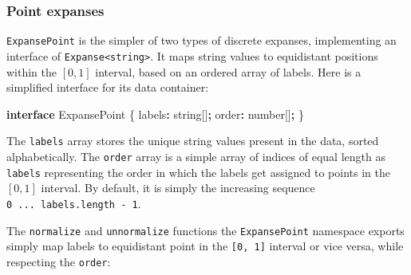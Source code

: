 \documentclass[
  openany]{book}
\newenvironment{Shaded}{\begin{snugshade}}{\end{snugshade}}
\newcommand{\DataTypeTok}[1]{\textcolor[rgb]{0.13,0.29,0.53}{#1}}
\newcommand{\KeywordTok}[1]{\textcolor[rgb]{0.13,0.29,0.53}{\textbf{#1}}}
\newcommand{\NormalTok}[1]{#1}
\newcommand{\OperatorTok}[1]{\textcolor[rgb]{0.81,0.36,0.00}{\textbf{#1}}}
\theoremstyle{definition}
\theoremstyle{definition}
\theoremstyle{definition}
\theoremstyle{definition}
\theoremstyle{remark}
\begin{document}
\subsubsection{Point expanses}\label{point-expanses}

\texttt{ExpansePoint} is the simpler of two types of discrete expanses, implementing an interface of \texttt{Expanse\textless{}string\textgreater{}}. It maps string values to equidistant positions within the \([0,1]\) interval, based on an ordered array of labels. Here is a simplified interface for its data container:

\begin{Shaded}
\begin{Highlighting}[]
\KeywordTok{interface}\NormalTok{ ExpansePoint \{}
\NormalTok{    labels}\OperatorTok{:} \DataTypeTok{string}\NormalTok{[]}\OperatorTok{;}
\NormalTok{    order}\OperatorTok{:} \DataTypeTok{number}\NormalTok{[]}\OperatorTok{;}
\NormalTok{\}}
\end{Highlighting}
\end{Shaded}

The \texttt{labels} array stores the unique string values present in the data, sorted alphabetically. The \texttt{order} array is a simple array of indices of equal length as \texttt{labels} representing the order in which the labels get assigned to points in the \([0, 1]\) interval. By default, it is simply the increasing sequence \texttt{0\ ...\ labels.length\ -\ 1}.

The \texttt{normalize} and \texttt{unnormalize} functions the \texttt{ExpansePoint} namespace exports simply map labels to equidistant point in the \texttt{{[}0,\ 1{]}} interval or vice versa, while respecting the \texttt{order}:
\end{document}
